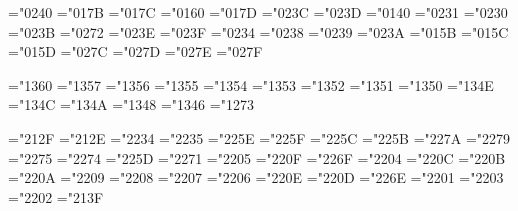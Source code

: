 \mathchardef\aleph="0240
\def\hbar{{\mathchar'26\mkern-9muh}}
\mathchardef\imath="017B
\mathchardef\jmath="017C
\mathchardef\ell="0160
\mathchardef\wp="017D
\mathchardef\Re="023C
\mathchardef\Im="023D
\mathchardef\partial="0140
\mathchardef\infty="0231
\mathchardef\prime="0230
\mathchardef\emptyset="023B
\mathchardef\nabla="0272
\def\surd{{\mathchar"1270}}
\mathchardef\top="023E
\mathchardef\bot="023F
\def\angle{{\vbox{\ialign{$\m@th\scriptstyle##$\crcr
      \not\mathrel{\mkern14mu}\crcr
      \noalign{\prevdepth-1000pt}
      \mkern2.5mu\leaders\hrule height.34pt\hfill\mkern2.5mu\crcr}}}}
\mathchardef\triangle="0234
\mathchardef\forall="0238
\mathchardef\exists="0239
\mathchardef\neg="023A \let\lnot=\neg
\mathchardef\flat="015B
\mathchardef\natural="015C
\mathchardef\sharp="015D
\mathchardef\clubsuit="027C
\mathchardef\diamondsuit="027D
\mathchardef\heartsuit="027E
\mathchardef\spadesuit="027F

\mathchardef\coprod="1360
\mathchardef\bigvee="1357
\mathchardef\bigwedge="1356
\mathchardef\biguplus="1355
\mathchardef\bigcap="1354
\mathchardef\bigcup="1353
\mathchardef\intop="1352 \def\int{\intop\nolimits}
\mathchardef\prod="1351
\mathchardef\sum="1350
\mathchardef\bigotimes="134E
\mathchardef\bigoplus="134C
\mathchardef\bigodot="134A
\mathchardef\ointop="1348 \def\oint{\ointop\nolimits}
\mathchardef\bigsqcup="1346
\mathchardef\smallint="1273

\mathchardef\triangleleft="212F
\mathchardef\triangleright="212E
\mathchardef\bigtriangleup="2234
\mathchardef\bigtriangledown="2235
\mathchardef\wedge="225E \let\land=\wedge
\mathchardef\vee="225F \let\lor=\vee
\mathchardef\cap="225C
\mathchardef\cup="225B
\mathchardef\ddagger="227A
\mathchardef\dagger="2279
\mathchardef\sqcap="2275
\mathchardef\sqcup="2274
\mathchardef\uplus="225D
\mathchardef\amalg="2271
\mathchardef\diamond="2205
\mathchardef\bullet="220F
\mathchardef\wr="226F
\mathchardef\div="2204
\mathchardef\odot="220C
\mathchardef\oslash="220B
\mathchardef\otimes="220A
\mathchardef\ominus="2209
\mathchardef\oplus="2208
\mathchardef\mp="2207
\mathchardef\pm="2206
\mathchardef\circ="220E
\mathchardef\bigcirc="220D
\mathchardef\setminus="226E %
\mathchardef\cdot="2201
\mathchardef\ast="2203
\mathchardef\times="2202
\mathchardef\star="213F

